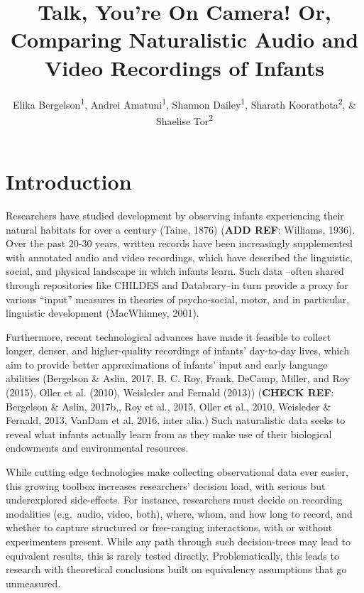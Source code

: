 \documentclass[floatsintext,man]{apa6}
\title{Talk, You're On Camera! Or, Comparing Naturalistic Audio and Video
Recordings of Infants}
\author{Elika Bergelson\textsuperscript{1}, Andrei Amatuni\textsuperscript{1}, Shannon Dailey\textsuperscript{1}, Sharath Koorathota\textsuperscript{2}, \& Shaelise Tor\textsuperscript{2}}
\affiliation{
    \vspace{0.5cm}
          \textsuperscript{1} Duke University\\
          \textsuperscript{2} University of Rochester  }
\theoremstyle{definition}
\theoremstyle{definition}
\theoremstyle{definition}
\theoremstyle{remark}
\begin{document}
\maketitle

\setcounter{secnumdepth}{0}



\section{Introduction}\label{introduction}

Researchers have studied development by observing infants experiencing
their natural habitats for over a century (Taine, 1876) (\textbf{ADD
REF}: Williams, 1936). Over the past 20-30 years, written records have
been increasingly supplemented with annotated audio and video
recordings, which have described the linguistic, social, and physical
landscape in which infants learn. Such data --often shared through
repositories like CHILDES and Databrary--in turn provide a proxy for
various \enquote{input} measures in theories of psycho-social, motor,
and in particular, linguistic development (MacWhinney, 2001).

Furthermore, recent technological advances have made it feasible to
collect longer, denser, and higher-quality recordings of infants'
day-to-day lives, which aim to provide better approximations of infants'
input and early language abilities (Bergelson \& Aslin, 2017, B. C. Roy,
Frank, DeCamp, Miller, and Roy (2015), Oller et al. (2010), Weisleder
and Fernald (2013)) (\textbf{CHECK REF}: Bergelson \& Aslin, 2017b,, Roy
et al., 2015, Oller et al., 2010, Weisleder \& Fernald, 2013, VanDam et
al, 2016, inter alia.) Such naturalistic data seeks to reveal what
infants actually learn from as they make use of their biological
endowments and environmental resources.

While cutting edge technologies make collecting observational data ever
easier, this growing toolbox increases researchers' decision load, with
serious but underexplored side-effects. For instance, researchers must
decide on recording modalities (e.g.~audio, video, both), where, whom,
and how long to record, and whether to capture structured or
free-ranging interactions, with or without experimenters present. While
any path through such decision-trees may lead to equivalent results,
this is rarely tested directly. Problematically, this leads to research
with theoretical conclusions built on equivalency assumptions that go
unmeasured.
\end{document}
